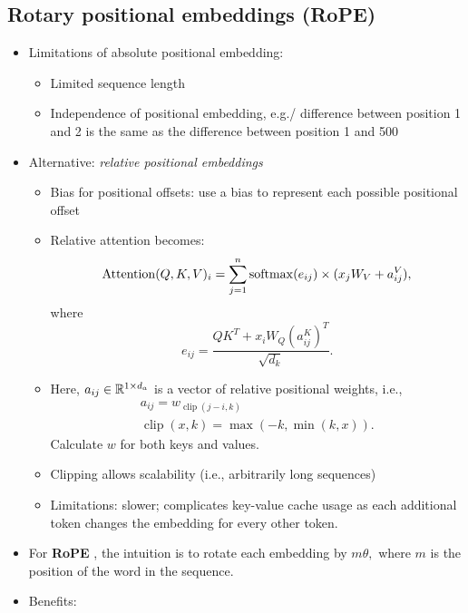 \subsection{Rotary positional embeddings (RoPE)}
\begin{itemize}
	\item Limitations of absolute positional embedding:
	\begin{itemize}
		\item Limited sequence length
		\item Independence of positional embedding, e.g./ difference between position 1 and 2 is the same as the difference between position 1 and 500
	\end{itemize}
    \item Alternative: \textit{relative positional embeddings} \cite{relposrep}
    \begin{itemize}
        \item Bias for positional offsets: use a bias to represent each possible positional offset
        \item Relative attention becomes:
        \begin{equation*}
            \operatorname{Attention}(Q,K,V)_i = \sum_{j=1}^{n}\operatorname{softmax}(e_{ij}) \times (x_jW_V + a_{ij}^V),
        \end{equation*}
        where
        \begin{equation*}
            e_{ij} = \frac{QK^T + x_iW_Q(a_{ij}^K)^T}{\sqrt{d_k}}.
        \end{equation*}
        \item Here, $a_{ij} \in \mathbb{R}^{1\times d_a}$ is a vector of relative positional weights, i.e.,
        \begin{gather*}
            a_{ij} = w_{\operatorname{clip}(j-i,k)}\\
            \operatorname{clip}(x,k) = \max(-k, \min(k,x)).
        \end{gather*}
        Calculate $w$ for both keys and values.
        \item Clipping allows scalability (i.e., arbitrarily long sequences)
        \item Limitations: slower; complicates key-value cache usage as each additional token changes the embedding for every other token.
    \end{itemize}
    \item For \textbf{RoPE} \cite{rotpos}, the intuition is to rotate each embedding by $m \theta,$ where $m$ is the position of the word in the sequence.
    \item Benefits:

\end{itemize}

